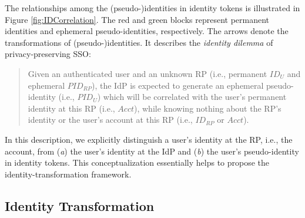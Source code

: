 The relationships among the (pseudo-)identities in identity tokens is illustrated in Figure \ref{fig:IDCorrelation}.
The red and green blocks represent permanent identities and ephemeral pseudo-identities, respectively.
The arrows denote the transformations of (pseudo-)identities.
It describes the {\em identity dilemma} of privacy-preserving SSO:
\begin{quote}
Given an authenticated user and an unknown RP (i.e., permanent $ID_U$ and ephemeral $PID_{RP}$),
    the IdP is expected to generate an ephemeral pseudo-identity (i.e., $PID_{U}$)
     which will be correlated with the user's permanent identity at this RP (i.e., $Acct$),
     while knowing nothing about the RP's identity or the user's account at this RP (i.e., $ID_{RP}$ or $Acct$).
\end{quote}

In this description, we explicitly distinguish a user's identity at the RP, i.e., the account,
     from (\emph{a}) the user's identity at the IdP and (\emph{b}) the user's pseudo-identity in identity tokens.
This conceptualization
    essentially helps to propose the identity-transformation framework.


\subsection{Identity Transformation}
\label{subsec:solutions}




